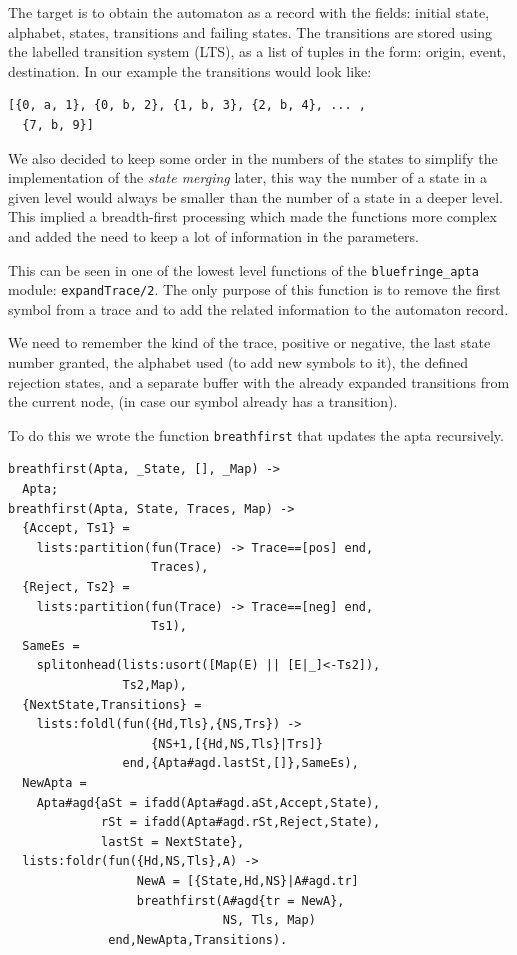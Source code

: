 \documentclass[]{sigplanconf}
\begin{document}
The target is to obtain the automaton as a record with the fields:
initial state, alphabet, states, transitions and failing states.
The transitions are stored using the labelled transition system (LTS),
as a list of tuples in the form: {origin, event, destination}. In
our example the transitions would look like:

\begin{verbatim}
[{0, a, 1}, {0, b, 2}, {1, b, 3}, {2, b, 4}, ... , 
  {7, b, 9}]
\end{verbatim}

We also decided to keep some order in the numbers of the states
to simplify the implementation of the \textit{state merging} later,
this way the number of a state in a given level would always
be smaller than the number of a state in a deeper level. This implied a
breadth-first processing which made the functions more complex
and added the need to keep a lot of information in the parameters.

This can be seen in one of the lowest level functions of the
\texttt{bluefringe\_apta} module: \texttt{expandTrace/2}.
The only purpose of this function
is to remove the first symbol from a trace and to add the related 
information to the automaton record.

We need to  remember the kind of the trace, positive or negative, 
the last state number granted,
the alphabet used (to add new symbols to it), the defined
rejection states, and a separate buffer with the already expanded
transitions from the current node, (in case our symbol already
has a transition).

To do this we wrote the function \texttt{breathfirst} that
updates the apta recursively. 
\begin{verbatim}
breathfirst(Apta, _State, [], _Map) ->
  Apta;
breathfirst(Apta, State, Traces, Map) ->
  {Accept, Ts1} = 
    lists:partition(fun(Trace) -> Trace==[pos] end, 
                    Traces),
  {Reject, Ts2} = 
    lists:partition(fun(Trace) -> Trace==[neg] end, 
                    Ts1),
  SameEs = 
    splitonhead(lists:usort([Map(E) || [E|_]<-Ts2]),
                Ts2,Map),
  {NextState,Transitions} =
    lists:foldl(fun({Hd,Tls},{NS,Trs}) ->
                    {NS+1,[{Hd,NS,Tls}|Trs]}
                end,{Apta#agd.lastSt,[]},SameEs),
  NewApta =
    Apta#agd{aSt = ifadd(Apta#agd.aSt,Accept,State),
             rSt = ifadd(Apta#agd.rSt,Reject,State),
             lastSt = NextState},
  lists:foldr(fun({Hd,NS,Tls},A) ->
                  NewA = [{State,Hd,NS}|A#agd.tr]
                  breathfirst(A#agd{tr = NewA},
                              NS, Tls, Map)
              end,NewApta,Transitions).
\end{verbatim}
\end{document}
